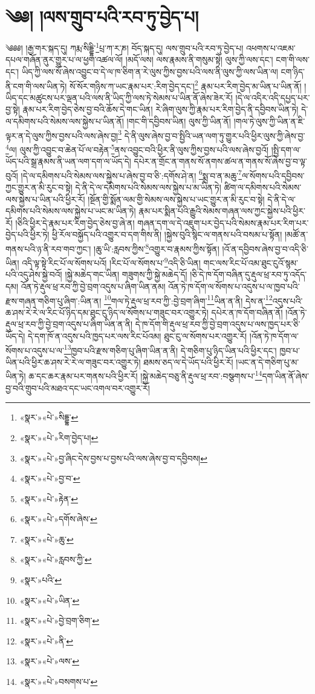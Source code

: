 \chapter{༄༅། །ལས་གྲུབ་པའི་རབ་ཏུ་བྱེད་པ།}༄༅༅། །རྒྱ་གར་སྐད་དུ། ཀརྨ་སིདྡྷི་\footnote{«སྣར་»«པེ་»སིདྡྷ་}པྲ་ཀ་ར་ཎ། བོད་སྐད་དུ། ལས་གྲུབ་པའི་རབ་ཏུ་བྱེད་པ། འཕགས་པ་འཇམ་དཔལ་གཞོན་ནུར་གྱུར་པ་ལ་ཕྱག་འཚལ་ལོ། །མདོ་ལས། ལས་རྣམས་ནི་གསུམ་སྟེ། ལུས་ཀྱི་ལས་དང་། ངག་གི་ལས་དང་། ཡིད་ཀྱི་ལས་སོ་ཞེས་འབྱུང་བ་དེ་ལ་ཁ་ཅིག་ན་རེ་ལུས་ཀྱིས་བྱས་པའི་ལས་ནི་ལུས་ཀྱི་ལས་ཡིན་ལ། ངག་ཉིད་ནི་ངག་གི་ལས་ཡིན་ཏེ། སོ་སོར་གཉིས་ཀ་ཡང་རྣམ་པར་:རིག་བྱེད་དང་།\footnote{«སྣར་»«པེ་»རིག་བྱེད་པ།} རྣམ་པར་རིག་བྱེད་མ་ཡིན་པ་ཡིན་ནོ། །ཡིད་དང་མཚུངས་པར་ལྡན་པའི་ལས་ནི་ཡིད་ཀྱི་ལས་ཏེ་སེམས་པ་ཡིན་ནོ་ཞེས་ཟེར་རོ། །དེ་ལ་འདིར་འདི་དཔྱད་པར་བྱ་སྟེ། རྣམ་པར་རིག་བྱེད་ཅེས་བྱ་བའི་ཆོས་དེ་གང་ཡིན། རེ་ཞིག་ལུས་ཀྱི་རྣམ་པར་རིག་བྱེད་ནི་དབྱིབས་ཡིན་ཏེ། དེ་ལ་དམིགས་པའི་སེམས་ལས་སྐྱེས་པ་ཡིན་ནོ། །གང་གི་དབྱིབས་ཡིན། ལུས་ཀྱི་ཡིན་ནོ། །གལ་ཏེ་ལུས་ཀྱི་ཡིན་ན་ཇི་ལྟར་ན་དེ་ལུས་ཀྱིས་བྱས་པའི་ལས་ཞེས་བྱ།\footnote{«སྣར་»«པེ་»བྱ་ཞིང་དེས་བྱས་པ་བྱས་པའི་ལས་ཞེས་བྱ་བ་དབྱིབས།} དེ་ནི་ལུས་ཞེས་བྱ་བ་སྤྱིའི་ཡན་ལག་ཏུ་གྱུར་པའི་ཕྱིར་ལུས་ཀྱི་ཞེས་བྱ་\footnote{«སྣར་»«པེ་»བྱ་བ་}ལ། ལུས་ཀྱི་འབྱུང་བ་ཆེན་པོ་ལ་བརྟེན་\footnote{«སྣར་»«པེ་»རྟེན་}ནས་འབྱུང་བའི་ཕྱིར་ནི་ལུས་ཀྱིས་བྱས་པའི་ལས་ཞེས་བྱའོ། །སྤྱི་དག་ལ་ཡོད་པའི་སྒྲ་རྣམས་ནི་ཡན་ལག་དག་ལ་ཡོད་དེ། དཔེར་ན་གྲོང་ན་གནས་སོ་ནགས་ཚལ་ན་གནས་སོ་ཞེས་བྱ་བ་ལྟ་བུའོ། །དེ་ལ་དམིགས་པའི་སེམས་ལས་སྐྱེས་པ་ཞེས་བྱ་བ་ཅི་:དགོས་ཤེ་ན། \footnote{«སྣར་»«པེ་»དགོས་ཞེས་}སྨྲ་བ་ན་མཆུ་\footnote{«སྣར་»«པེ་»ཆུ་}ལ་སོགས་པའི་དབྱིབས་ཀྱང་གྱུར་ན་མི་རུང་བ་སྟེ། དེ་ནི་དེ་ལ་དམིགས་པའི་སེམས་ལས་སྐྱེས་པ་མ་ཡིན་ཏེ། ཚིག་ལ་དམིགས་པའི་སེམས་ལས་སྐྱེས་པ་ཡིན་པའི་ཕྱིར་རོ། །སྔོན་གྱི་སྨོན་ལམ་གྱི་སེམས་ལས་སྐྱེས་པ་ཡང་གྱུར་ན་མི་རུང་བ་སྟེ། དེ་ནི་དེ་ལ་དམིགས་པའི་སེམས་ལས་སྐྱེས་པ་ཡང་མ་ཡིན་ཏེ། རྣམ་པར་སྨིན་པའི་རྒྱུའི་སེམས་གཞན་ལས་ཀྱང་སྐྱེས་པའི་ཕྱིར་རོ། །ཅིའི་ཕྱིར་དེ་རྣམ་པར་རིག་བྱེད་ཅེས་བྱ་ཞེ་ན། གཞན་དག་ལ་དེ་འཇུག་པར་བྱེད་པའི་སེམས་རྣམ་པར་རིག་པར་བྱེད་པའི་ཕྱིར་ཏེ། ཕྱི་རོལ་བསྐྱོད་པའི་འགྱུར་བ་དག་གིས་ནི། །སྐྱེས་བུའི་སྙིང་ལ་གནས་པའི་བསམ་པ་སྟོན། །མཚོ་ན་གནས་པའི་ཉ་ནི་རབ་གབ་ཀྱང་། །ཆུ་ཡི་:རླབས་ཀྱིས་\footnote{«སྣར་»«པེ་»རླབས་ཀྱི་}འགྱུར་བ་རྣམས་ཀྱིས་སྟོན། །འོ་ན་དབྱིབས་ཞེས་བྱ་བ་འདི་ཅི་ཡིན། འདི་ལྟ་སྟེ་རིང་པོ་ལ་སོགས་པའོ། །རིང་པོ་ལ་སོགས་པ་\footnote{«སྣར་»པའི་}འདི་ཅི་ཡིན། གང་ལས་རིང་པོ་འམ་ཐུང་ངུའོ་སྙམ་པའི་འདུ་ཤེས་སྐྱེ་བའོ། །སྐྱེ་མཆེད་གང་ཡིན། གཟུགས་ཀྱི་སྐྱེ་མཆེད་དོ། །ཅི་དེ་ཁ་དོག་བཞིན་དུ་རྡུལ་ཕྲ་རབ་ཏུ་འདོད་དམ། འོན་ཏེ་རྡུལ་ཕྲ་རབ་ཀྱི་བྱེ་བྲག་འདུས་པ་ཞིག་ཡིན་ནམ། འོན་ཏེ་ཁ་དོག་ལ་སོགས་པ་འདུས་པ་ལ་ཁྱབ་པའི་རྫས་གཞན་གཅིག་པུ་ཞིག་:ཡིན་ན། \footnote{«སྣར་»«པེ་»ཡིན་}གལ་ཏེ་རྡུལ་ཕྲ་རབ་ཀྱི་:བྱེ་བྲག་ཞིག་\footnote{«སྣར་»«པེ་»བྱེ་བྲག་ཅིག་}ཡིན་ན་ནི། དེས་ན་\footnote{«སྣར་»«པེ་»ནི་}འདུས་པའི་ཆ་ཤས་རེ་རེ་ལ་རིང་པོ་ཉིད་དམ་ཐུང་ངུ་ཉིད་ལ་སོགས་པ་གཟུང་བར་འགྱུར་ཏེ། དཔེར་ན་ཁ་དོག་བཞིན་ནོ། །འོན་ཏེ་རྡུལ་ཕྲ་རབ་ཀྱི་བྱེ་བྲག་འདུས་པ་ཞིག་ཡིན་ན་ནི། དེ་ཁ་དོག་གི་རྡུལ་ཕྲ་རབ་ཀྱི་བྱེ་བྲག་འདུས་པ་ལས་ཁྱད་པར་ཅི་ཡོད་དེ། དེ་དག་ཁོ་ན་འདུས་པའི་ཁྱད་པར་ལས་རིང་པོའམ། ཐུང་ངུ་ལ་སོགས་པར་འགྱུར་རོ། །འོན་ཏེ་ཁ་དོག་ལ་སོགས་པ་འདུས་པ་ལ་\footnote{«སྣར་»«པེ་»ལས་}ཁྱབ་པའི་རྫས་གཅིག་པུ་ཞིག་ཡིན་ན་ནི། དེ་གཅིག་པུ་ཉིད་ཡིན་པའི་ཕྱིར་དང་། ཁྱབ་པ་ཡིན་པའི་ཕྱིར་ཆ་ཤས་རེ་རེ་ལ་གཟུང་བར་འགྱུར་ཏེ། ཐམས་ཅད་ལ་དེ་ཡོད་པའི་ཕྱིར་རོ། །ཡང་ན་དེ་གཅིག་པུ་མ་ཡིན་ཏེ། ཆ་དང་ཆར་རྣམ་པར་གནས་པའི་ཕྱིར་རོ། །སྐྱེ་མཆེད་བཅུ་ནི་རྡུལ་ཕྲ་རབ་:བསྩགས་པ་\footnote{«སྣར་»«པེ་»བསགས་པ་}དག་ཡིན་ནོ་ཞེས་བྱ་བའི་གྲུབ་པའི་མཐའ་དང་ཡང་འགལ་བར་འགྱུར་རོ། 